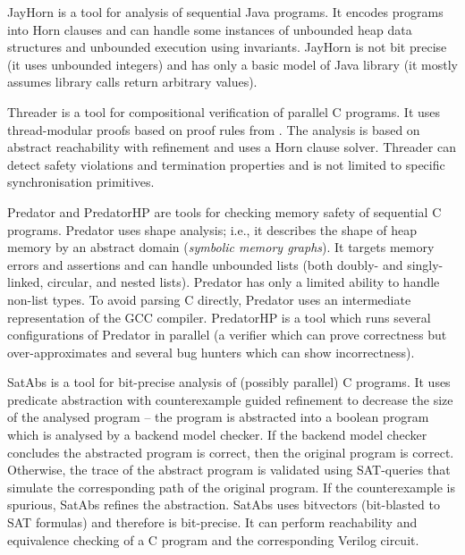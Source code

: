 JayHorn  is a tool for analysis of sequential Java programs.
It encodes programs into Horn clauses and can handle some instances of unbounded heap data structures and unbounded execution using invariants.
JayHorn is not bit precise (it uses unbounded integers) and has only a basic model of Java library (it mostly assumes library calls return arbitrary values).

Threader  is a tool for compositional verification of parallel C programs.
It uses thread-modular proofs based on proof rules from .
The analysis is based on abstract reachability with refinement and uses a Horn clause solver.
Threader can detect safety violations and termination properties and is not limited to specific synchronisation primitives.

Predator and PredatorHP  are tools for checking memory safety of sequential C programs.
Predator uses shape analysis; i.e., it describes the shape of heap memory by an abstract domain (\emph{symbolic memory graphs}).
It targets memory errors and assertions and can handle unbounded lists (both doubly- and singly-linked, circular, and nested lists).
Predator has only a limited ability to handle non-list types.
To avoid parsing C directly, Predator uses an intermediate representation of the GCC compiler.
PredatorHP is a tool which runs several configurations of Predator in parallel (a verifier which can prove correctness but over-approximates and several bug hunters which can show incorrectness).

SatAbs  is a tool for bit-precise analysis of (possibly parallel) C programs.
It uses predicate abstraction with counterexample guided refinement to decrease the size of the analysed program -- the program is abstracted into a boolean program which is analysed by a backend model checker.
If the backend model checker concludes the abstracted program is correct, then the original program is correct.
Otherwise, the trace of the abstract program is validated using SAT-queries that simulate the corresponding path of the original program.
If the counterexample is spurious, SatAbs refines the abstraction.
SatAbs uses bitvectors (bit-blasted to SAT formulas) and therefore is bit-precise.
It can perform reachability and equivalence checking of a C program and the corresponding Verilog circuit.


